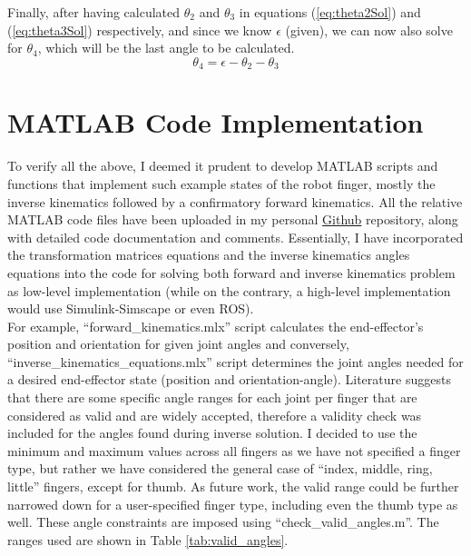 \documentclass[a4paper,12pt]{article}
\begin{document}
Finally, after having calculated $\theta_{2}$ and $\theta_{3}$ in equations (\ref{eq:theta2Sol}) and (\ref{eq:theta3Sol}) respectively, and since we know $\epsilon$ (given), we can now also solve for $\theta_{4}$, which will be the last angle to be calculated.
\begin{equation}
\label{eq:theta4Sol}
     \boxed{\theta_{4} = \epsilon - \theta_{2} - \theta_{3}}
\end{equation}


\section{MATLAB Code Implementation}
To verify all the above, I deemed it prudent to develop MATLAB scripts and functions that implement such example states of the robot finger, mostly the inverse kinematics followed by a confirmatory forward kinematics. All the relative MATLAB code files have been uploaded in my personal \href{https://github.com/Inglezos/BME_Robotic_Finger_Project}{Github} repository, along with detailed code documentation and comments. Essentially, I have incorporated the transformation matrices equations and the inverse kinematics angles equations into the code for solving both forward and inverse kinematics problem as low-level implementation (while on the contrary, a high-level implementation would use Simulink-Simscape or even ROS).\\

For example, ``forward\_kinematics.mlx'' script calculates the end-effector's position and orientation for given joint angles and conversely, ``inverse\_kinematics\_equations.mlx'' script determines the joint angles needed for a desired end-effector state (position and orientation-angle). Literature suggests \cite{CheckValidAngles_BEST_chen2013constraint, CheckValidAngles_cobos2008efficient, CheckValidAngles_lee2014flexion, CheckValidAngles_ngeo2014continuous} that there are some specific angle ranges for each joint per finger that are considered as valid and are widely accepted, therefore a validity check was included for the angles found during inverse solution. I decided to use the minimum and maximum values across all fingers as we have not specified a finger type, but rather we have considered the general case of ``index, middle, ring, little'' fingers, except for thumb. As future work, the valid range could be further narrowed down for a user-specified finger type, including even the thumb type as well. These angle constraints are imposed using ``check\_valid\_angles.m''. The ranges used are shown in Table \ref{tab:valid_angles}.
\end{document}
